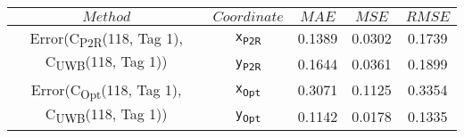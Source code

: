 \begin{table}[h]
\centering
\begin{tabular}{|c|c|c|c|c|}
\hline
$Method$ & $Coordinate$ & $MAE$ & $MSE$ & $RMSE$ \\
\hline
\multirow{2}{*}{{\footnotesize Error(C\textsubscript{P2R}(118, Tag 1), C\textsubscript{UWB}(118, Tag 1))}} & \texttt{x\textsubscript{P2R}} & 0.1389 & 0.0302 & 0.1739 \\
& \texttt{y\textsubscript{P2R}} & 0.1644 & 0.0361 & 0.1899 \\
\hline
\multirow{2}{*}{{\footnotesize Error(C\textsubscript{Opt}(118, Tag 1), C\textsubscript{UWB}(118, Tag 1))}} & \texttt{x\textsubscript{Opt}} & 0.3071 & 0.1125 & 0.3354 \\
& \texttt{y\textsubscript{Opt}} & 0.1142 & 0.0178 & 0.1335 \\
\hline
\end{tabular}
\end{table}
